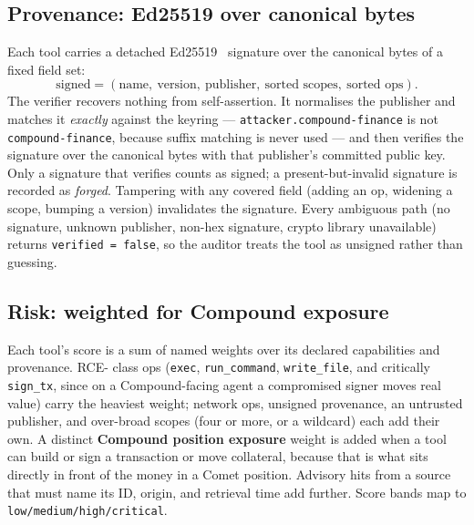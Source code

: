 \documentclass[11pt]{article}
\begin{document}
\subsection{Provenance: Ed25519 over canonical bytes}
Each tool carries a detached Ed25519~\cite{ed25519} signature over the canonical bytes of a
fixed field set:
\[
\text{signed} = (\text{name},\ \text{version},\ \text{publisher},\ \text{sorted scopes},\ \text{sorted ops}).
\]
The verifier recovers nothing from self-assertion. It normalises the publisher and matches it
\emph{exactly} against the keyring --- \texttt{attacker.compound-finance} is not
\texttt{compound-finance}, because suffix matching is never used --- and then verifies the
signature over the canonical bytes with that publisher's committed public key. Only a signature
that verifies counts as signed; a present-but-invalid signature is recorded as \emph{forged}.
Tampering with any covered field (adding an op, widening a scope, bumping a version) invalidates
the signature. Every ambiguous path (no signature, unknown publisher, non-hex signature, crypto
library unavailable) returns \texttt{verified = false}, so the auditor treats the tool as
unsigned rather than guessing.

\subsection{Risk: weighted for Compound exposure}
Each tool's score is a sum of named weights over its declared capabilities and provenance. RCE-
class ops (\texttt{exec}, \texttt{run\_command}, \texttt{write\_file}, and critically
\texttt{sign\_tx}, since on a Compound-facing agent a compromised signer moves real value)
carry the heaviest weight; network ops, unsigned provenance, an untrusted publisher, and
over-broad scopes (four or more, or a wildcard) each add their own. A distinct \textbf{Compound
position exposure} weight is added when a tool can build or sign a transaction or move
collateral, because that is what sits directly in front of the money in a Comet position.
Advisory hits from a source that must name its ID, origin, and retrieval time add further.
Score bands map to \texttt{low/medium/high/critical}.
\end{document}
